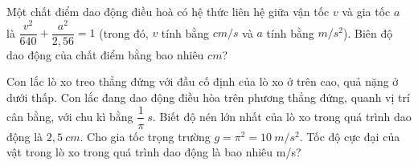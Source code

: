 \begin{ex}
	Một chất điểm dao động điều hoà có hệ thức liên hệ giữa vận tốc $v$ và gia tốc $a$ là $\dfrac{v^2}{640}+\dfrac{a^2}{2,56}=1$ (trong đó, $v$ tính bằng $cm/s$ và $a$ tính bằng $m/s^2$). Biên độ dao động của chất điểm bằng bao nhiêu $cm$?
\end{ex}
\begin{ex}%
	Con lắc lò xo treo thẳng đứng với đầu cố định của lò xo ở trên cao, quả nặng ở dưới thấp. Con lắc đang dao động điều hòa trên phương thẳng đứng, quanh vị trí cân bằng, với chu kì bằng $\dfrac{1}{\pi}\ s$. Biết độ nén lớn nhất của lò xo trong quá trình dao động là $2,5\ cm$. Cho gia tốc trọng trường $g = \pi^2 = 10\ m/s^2$. Tốc độ cực đại của vật trong lò xo trong quá trình dao động là bao nhiêu m/s?
\end{ex}